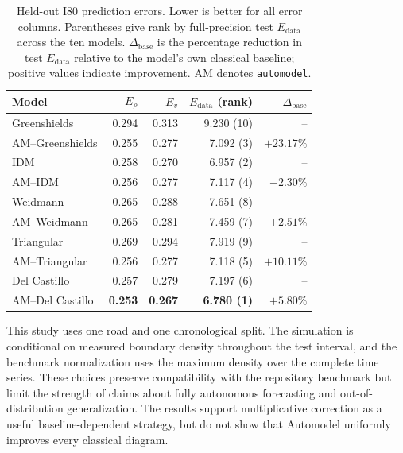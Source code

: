 \begin{table}[t]
    \centering
    \small
    \setlength{\tabcolsep}{3.5pt}
    \caption{Held-out I80 prediction errors. Lower is better for all error
    columns. Parentheses give rank by full-precision test
    $E_{\mathrm{data}}$ across the ten models. $\Delta_{\mathrm{base}}$ is the
    percentage reduction in test $E_{\mathrm{data}}$ relative to the model's
    own classical baseline; positive values indicate improvement. AM denotes
    \texttt{automodel}.}
    \label{tab:traffic-test-results}
    \begin{tabular}{@{}lrrrr@{}}
        \toprule
        Model & $E_\rho$ & $E_v$ & $E_{\mathrm{data}}$ (rank)
              & $\Delta_{\mathrm{base}}$ \\
        \midrule
        Greenshields       & 0.294 & 0.313 & 9.230 (10) & --         \\
        AM--Greenshields   & 0.255 & 0.277 & 7.092 (3)  & $+23.17\%$ \\
        IDM                & 0.258 & 0.270 & 6.957 (2)  & --         \\
        AM--IDM            & 0.256 & 0.277 & 7.117 (4)  & $-2.30\%$  \\
        Weidmann           & 0.265 & 0.288 & 7.651 (8)  & --         \\
        AM--Weidmann       & 0.265 & 0.281 & 7.459 (7)  & $+2.51\%$  \\
        Triangular         & 0.269 & 0.294 & 7.919 (9)  & --         \\
        AM--Triangular     & 0.256 & 0.277 & 7.118 (5)  & $+10.11\%$ \\
        Del Castillo       & 0.257 & 0.279 & 7.197 (6)  & --         \\
        AM--Del Castillo   & \textbf{0.253} & \textbf{0.267}
                           & \textbf{6.780 (1)} & $+5.80\%$ \\
        \bottomrule
    \end{tabular}
\end{table}

This study uses one road and one chronological split. The simulation
is conditional on measured boundary density throughout the test interval, and
the benchmark normalization uses the maximum density over the complete time
series. These choices preserve compatibility with the repository benchmark but
limit the strength of claims about fully autonomous forecasting and
out-of-distribution generalization. The results support multiplicative
correction as a useful baseline-dependent strategy, but do not show that
Automodel uniformly improves every classical diagram.
